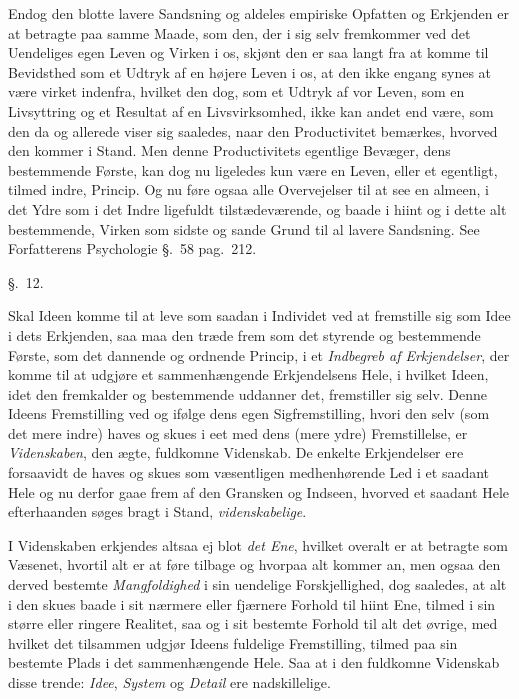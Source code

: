 \documentclass[12pt,a4paper]{book}
\newcommand{\apage}[1]{\marginnote{\footnotesize\textit{[#1]}}}
\begin{document}
Endog den blotte lavere Sandsning og aldeles empiriske Opfatten og Erkjenden er
at betragte paa samme Maade, som den, der i sig selv fremkommer ved det
Uendeliges egen Leven og Virken i os, skjønt den er saa langt fra at komme til
Bevidsthed som et Udtryk af en højere Leven i os, at den ikke engang synes at
være virket indenfra, hvilket den dog, som et Udtryk af vor Leven, som en
Livsyttring og et Resultat af en Livsvirksomhed, ikke kan andet end være, som den
da og allerede viser sig saaledes, naar den Productivitet bemærkes, hvorved den
kommer i Stand. Men denne Productivitets egentlige Bevæger, dens bestemmende
Første, kan dog nu ligeledes kun være en Leven, eller et egentligt, tilmed indre,
Princip. Og nu føre ogsaa alle Overvejelser til at see en almeen, i det Ydre som
i det Indre ligefuldt tilstædeværende, og baade i hiint og i dette \apage{116} alt
bestemmende, Virken som sidste og sande Grund til al lavere Sandsning. See
Forfatterens Psychologie §.~58 pag.\ 212.

\begin{center}\large\S.~12.\end{center}

Skal Ideen komme til at leve som saadan i Individet ved at fremstille sig som Idee
i dets Erkjenden, saa maa den træde frem som det styrende og bestemmende Første,
som det dannende og ordnende Princip, i et \emph{Indbegreb af Erkjendelser}, der komme
til at udgjøre et sammenhængende Erkjendelsens Hele, i hvilket Ideen, idet den
fremkalder og bestemmende uddanner det, fremstiller sig selv. Denne Ideens
Fremstilling ved og ifølge dens egen Sigfremstilling, hvori den selv (som det
mere indre) haves og skues i eet med dens (mere ydre) Fremstillelse, er
\emph{Videnskaben}, den ægte, fuldkomne Videnskab. De enkelte Erkjendelser ere
forsaavidt de haves og skues som væsentligen medhenhørende Led i et saadant Hele
og nu derfor gaae frem af den Gransken og Indseen, hvorved et saadant Hele
efterhaanden søges bragt i Stand, \emph{videnskabelige}.

I Videnskaben erkjendes altsaa ej blot \emph{det Ene}, hvilket overalt er at
betragte som Væsenet, hvortil alt er at føre tilbage og hvorpaa alt kommer an,
men ogsaa den derved bestemte \emph{Mangfoldighed} i sin uendelige Forskjellighed,
dog saaledes, at alt i den skues baade i sit nærmere eller \apage{117} fjærnere Forhold til
hiint Ene, tilmed i sin større eller ringere Realitet, saa og i sit bestemte
Forhold til alt det øvrige, med hvilket det tilsammen udgjør Ideens fuldelige
Fremstilling, tilmed paa sin bestemte Plads i det sammenhængende Hele. Saa at i
den fuldkomne Videnskab disse trende: \emph{Idee}, \emph{System} og
\emph{Detail} ere nadskillelige.
\end{document}
